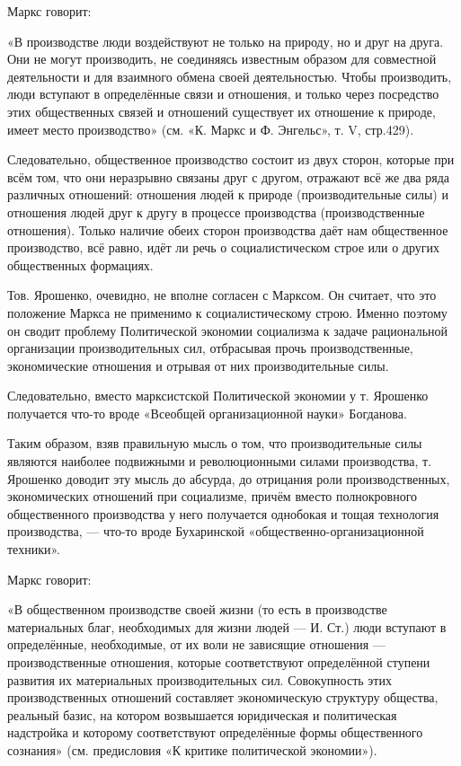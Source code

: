 \documentclass[12pt, a4paper, openany]{book}
\begin{document}
Маркс говорит:

«В производстве люди воздействуют не только на природу, но и друг на друга. Они не могут производить, не соединяясь известным образом для совместной деятельности и для взаимного обмена своей деятельностью. Чтобы производить, люди вступают в определённые связи и отношения, и только через посредство этих общественных связей и отношений существует их отношение к природе, имеет место производство» (см. «К. Маркс и Ф. Энгельс», т. V, стр.429).

Следовательно, общественное производство состоит из двух сторон, которые при всём том, что они неразрывно связаны друг с другом, отражают всё же два ряда различных отношений: отношения людей к природе (производительные силы) и отношения людей друг к другу в процессе производства (производственные отношения). Только наличие обеих сторон производства даёт нам общественное производство, всё равно, идёт ли речь о социалистическом строе или о других общественных формациях.

Тов. Ярошенко, очевидно, не вполне согласен с Марксом. Он считает, что это положение Маркса не применимо к социалистическому строю. Именно поэтому он сводит проблему Политической экономии социализма к задаче рациональной организации производительных сил, отбрасывая прочь производственные, экономические отношения и отрывая от них производительные силы.

Следовательно, вместо марксистской Политической экономии у т. Ярошенко получается что-то вроде «Всеобщей организационной науки» Богданова.

Таким образом, взяв правильную мысль о том, что производительные силы являются наиболее подвижными и революционными силами производства, т. Ярошенко доводит эту мысль до абсурда, до отрицания роли производственных, экономических отношений при социализме, причём вместо полнокровного общественного производства у него получается однобокая и тощая технология производства, — что-то вроде Бухаринской «общественно-организационной техники».

Маркс говорит:

«В общественном производстве своей жизни (то есть в производстве материальных благ, необходимых для жизни людей — И. Ст.) люди вступают в определённые, необходимые, от их воли не зависящие отношения — производственные отношения, которые соответствуют определённой ступени развития их материальных производительных сил. Совокупность этих производственных отношений составляет экономическую структуру общества, реальный базис, на котором возвышается юридическая и политическая надстройка и которому соответствуют определённые формы общественного сознания» (см. предисловия «К критике политической экономии»).
\end{document}
